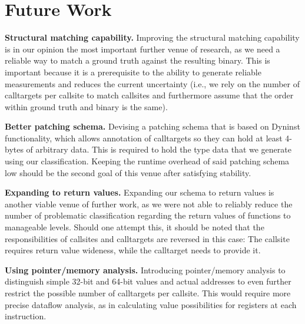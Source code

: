 \section{Future Work}
\label{chapter:Future_Work}
\textbf{Structural matching capability.} 
Improving the structural matching capability is in our opinion the most 
important further venue of research, as we need a reliable way to 
match a ground truth against the resulting binary. This is important 
because it is a prerequisite to the ability to generate reliable 
measurements and reduces the current uncertainty (i.e., we rely on the 
number of calltargets per callsite to match callsites and furthermore
assume that the order within ground truth and binary is the same).

\textbf{Better patching schema.} 
Devising a patching schema
that is based on Dyninst functionality, 
which allows annotation of calltargets so they can hold at least 
4-bytes of arbitrary data. This is required to hold the type data that
we generate using our classification. Keeping the runtime overhead
of said patching schema low should be the second goal of this venue 
after satisfying stability.

\textbf{Expanding to return values.} 
Expanding our schema to return values
is another viable venue of further work, as we were not able to 
reliably reduce the number of problematic classification regarding 
the return values of functions to 
manageable levels. Should one attempt this, it should be noted that the
responsibilities of callsites and calltargets are reversed in this 
case: The callsite requires return value wideness, while the calltarget
needs to provide it.

\textbf{Using pointer/memory analysis.} 
Introducing pointer/memory analysis
to distinguish simple 32-bit and 64-bit values and actual addresses to even further restrict the 
possible number of calltargets per callsite. This would require more 
precise dataflow analysis, as in calculating value possibilities for 
registers at each instruction.
